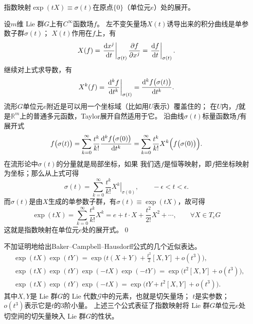 \begin{example}
    指数映射$\exp(t X)\equiv \sigma(t)$在原点$\{0\}$（单位元$e$）处的展开。
\end{example}
设$m$维 Lie 群$G$上有$C^\infty$函数场$f$。
左不变矢量场$X(t)$诱导出来的积分曲线是单参数子群$\sigma(t)$；%
$X(t)$作用在$f$上，有
\begin{equation}
    X(f) = \left.\frac{{\rm d} x^j}{{\rm d} t}\right|_{\sigma(t)}
     \frac{\partial f}{\partial x^j}
     = \left.\frac{{\rm d} f}{{\rm d} t}\right|_{\sigma(t)} .
\end{equation}
继续对上式求导数，有
\begin{equation}
    X^k(f) = \left.\frac{{\rm d}^k f}{{\rm d} t^k}\right|_{\sigma(t)} 
      = \frac{{\rm d}^k f\bigl(\sigma(t)\bigr)}{{\rm d} t^k}.
\end{equation}
流形$G$单位元$e$附近是可以用一个坐标域（比如用$U$表示）覆盖住的；
在$U$内，$f$就是$\mathbb{R}^m$上的普通多元函数，Taylor展开自然适用于它。
沿曲线$\sigma(t)$标量函数场$f$有展开式
\begin{equation}
    f\bigl(\sigma(t)\bigr) = \sum_{k=0}^{\infty}  \frac{t^k}{k!}
    \frac{{\rm d}^k f\bigl(\sigma(0)\bigr)}{{\rm d} t^k}
    =\sum_{k=0}^{\infty}  \frac{t^k}{k!}   X^k \Bigl(f\bigl(\sigma(0)\bigr)\Bigr).
\end{equation}
在流形论中$\sigma(t)$的分量就是局部坐标，如果
我们选$f$是恒等映射，即$f$把坐标映射为坐标；那么从上式可得
\begin{equation}
    \sigma(t) = \sum_{k=0}^{\infty} \frac{t^k}{k!} \left. X^k\right|_{\sigma(0)},
    \qquad -\epsilon < t <\epsilon .
\end{equation}
而$\sigma(t)$是由$X$生成的单参数子群，有$\sigma(t)\equiv \exp(tX)$，故可得
\begin{equation}\label{chlg:eqn_exp-pand}
    \exp(t X) = \sum_{k=0}^{\infty} \frac{t^k}{k!} X^k = e + t\cdot X 
      + \frac{t^2}{2!} X^2 + \cdots, \qquad \forall X\in T_e G
\end{equation}
这就是指数映射在单位元$e$处的展开式。\qed


不加证明地给出Baker--Campbell--Hausdorff公式\cite[\S 3.8]{huangxg-2024}的几个近似表达。 
\begin{align}
    &\exp(tX) \exp(tY) = \exp\bigl(t(X+Y)+\frac{t^2}{2} [X,Y]+o(t^3)\bigr), \label{chlg:eqn_BCH-xy} \\
    &\exp(tX) \exp(tY) \exp(-tX) \exp(-tY) =  \exp\bigl(t^2[X,Y]+o(t^3)\bigr), \label{chlg:eqn_BCH-xy-x-y} \\
    &\exp(tX) \exp(tY) \exp(-tX) =  \exp\bigl(tY+t^2[X,Y]+o(t^3)\bigr) . \label{chlg:eqn_BCH-xy-x}
\end{align}
其中$X,Y$是 Lie 群$G$的 Lie 代数$\mathscr{G}$中的元素，也就是切矢量场；
$t$是实参数；$o(t^3)$表示它是$t$的3阶小量。
上述三个公式表征了指数映射将 Lie 群$G$单位元$e$处切空间的切矢量映入 Lie 群$G$的性状。



